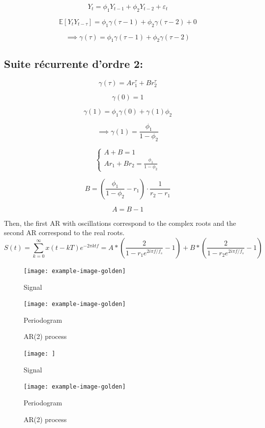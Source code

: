 \documentclass[11pt]{article}
\begin{document}
\begin{solution}  %

\[
Y_t = \phi_1 Y_{t-1} + \phi_2 Y_{t-2} + \varepsilon_t
\]

\[
\mathbb{E}[Y_t Y_{t-\tau}] = \phi_1 \gamma(\tau-1) + \phi_2 \gamma(\tau-2) + 0
\]

\[
\implies \gamma(\tau) = \phi_1 \gamma(\tau-1) + \phi_2 \gamma(\tau-2)
\]

\subsection*{Suite récurrente d'ordre 2:}
\[
\gamma(\tau) = A r_1^\tau+ B r_2^\tau
\]

\[
\gamma(0) = 1
\]

\[
\gamma(1) = \phi_1 \gamma(0) + \gamma(1) \phi_2
\]

\[
\implies \gamma(1) = \frac{\phi_1}{1 - \phi_2}
\]

\[
\begin{cases}
A + B = 1 \\
Ar_1 + Br_2 = \frac{\phi_1}{1 - \phi_2}
\end{cases}
\]

\[
B = \left( \frac{\phi_1}{1 - \phi_2} - r_1 \right) \cdot \frac{1}{r_2 - r_1}
\]

\[
A = B - 1
\]

Then, the first AR with oscillations correspond to the complex roots and the second AR correspond to the real roots.
\[
S(t) = \sum_{k=0}^{\infty} x(t-kT) e^{-2\pi ktf}
= A * ( \frac{2}{1 - r_1 e^{2i\pi f/f_s}} - 1 ) + B * ( \frac{2}{1 - r_2 e^{2i\pi f/f_s}} - 1 ) 
\]


\begin{figure}
    \centering
    \begin{minipage}[t]{0.45\textwidth}
    \centerline{\texttt{[image: example-image-golden]}}
    \centerline{Signal}
    \end{minipage}
    \hfill
    \begin{minipage}[t]{0.45\textwidth}    \centerline{\texttt{[image: example-image-golden]}}
    \centerline{Periodogram}
    \end{minipage}
    \caption{AR(2) process}\label{fig:q-ar-2}
\end{figure}

\begin{figure}
    \centering
    \begin{minipage}[t]{0.45\textwidth}
    \centerline{\texttt{[image: ]}}
    \centerline{Signal}
    \end{minipage}
    \hfill
    \begin{minipage}[t]{0.45\textwidth}    \centerline{\texttt{[image: example-image-golden]}}
    \centerline{Periodogram}
    \end{minipage}
    \caption{AR(2) process}\label{fig:q-ar-2}
\end{figure}

\end{solution}
\end{document}
